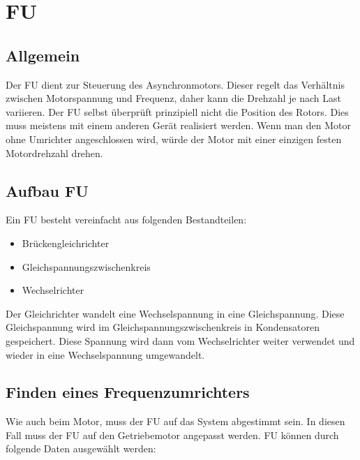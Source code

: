 \section{\acl{FU}}
\label{sec:frequenzumrichter}

\subsection{Allgemein}
\label{sec:allgemeinfrequenzumrichter}

Der \ac{FU} dient zur Steuerung des Asynchronmotors. Dieser regelt das Verhältnis zwischen Motorspannung und Frequenz, daher kann die Drehzahl je nach Last variieren. Der \ac{FU} selbst überprüft prinzipiell nicht die Position des Rotors. Dies muss meistens mit einem anderen Gerät realisiert werden. Wenn man den Motor ohne Umrichter angeschlossen wird, würde der Motor mit einer einzigen festen Motordrehzahl drehen. 

\subsection{Aufbau \acl{FU}}
\label{sec:aufbauFrequenzumrichter}

Ein \ac{FU} besteht vereinfacht aus folgenden Bestandteilen:

\begin{itemize}
	\item{Brückengleichrichter} %
	\item{Gleichspannungszwischenkreis}
	\item{Wechselrichter}
\end{itemize}

Der Gleichrichter wandelt eine Wechselspannung in eine Gleichspannung. Diese Gleichspannung wird im Gleichspannungszwischenkreis in Kondensatoren gespeichert. Diese Spannung wird dann vom Wechselrichter weiter verwendet und wieder in eine Wechselspannung umgewandelt.

\subsection{Finden eines Frequenzumrichters}
\label{sec:findenEinesFrequenzumrichter}

Wie auch beim Motor, muss der \ac{FU} auf das System abgestimmt sein. In diesen Fall muss der \ac{FU} auf den Getriebemotor angepasst werden. \ac{FU} können durch folgende Daten ausgewählt werden:

